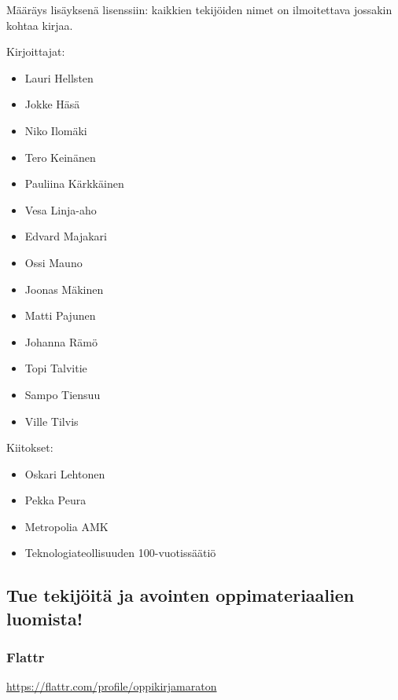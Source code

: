 Määräys lisäyksenä lisenssiin: kaikkien tekijöiden nimet on ilmoitettava jossakin kohtaa kirjaa.

\newpage

\begin{minipage}[t]{0.4\textwidth}
Kirjoittajat:
\begin{itemize}
\item Lauri Hellsten
\item Jokke Häsä
\item Niko Ilomäki
\item Tero Keinänen
\item Pauliina Kärkkäinen
\item Vesa Linja-aho
\item Edvard Majakari
\item Ossi Mauno
\item Joonas Mäkinen
\item Matti Pajunen
\item Johanna Rämö
\item Topi Talvitie
\item Sampo Tiensuu
\item Ville Tilvis
\end{itemize}
\end{minipage}
\begin{minipage}[t]{0.8\textwidth}
Kiitokset:
\begin{itemize}
\item Oskari Lehtonen %
\item Pekka Peura %
\item Metropolia AMK %
\item Teknologiateollisuuden 100-vuotissäätiö %
\end{itemize}
\end{minipage}

\subsection*{Tue tekijöitä ja avointen oppimateriaalien luomista!}

\subsubsection*{Flattr}
\url{https://flattr.com/profile/oppikirjamaraton}



